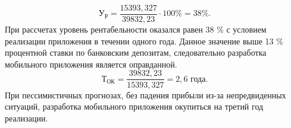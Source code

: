 \begin{equation}
 \label{eq:econ:add_payment}
 \text{У}_\text{Р} = \frac{15393,327}{39832,23} \cdot 100\% = 38\%.
\end{equation}
\linebreak
\linebreak
При рассчетах уровень рентабельности оказался равен 38 \% с условием реализации приложения в течении одного года. Данное значение выше 13 \% процентной ставки по банковским депозитам, следовательно разработка мобильного приложения является оправданной.
\linebreak
\linebreak
\begin{equation}
 \label{eq:econ:add_payment}
 \text{Т}_\text{ОК} = \frac{39832,23}{15393,327} = 2,6  \text{ года.}
\end{equation}
\linebreak
\linebreak
При пессимистичных прогнозах, без падения прибыли из-за непредвиденных ситуаций, разработка мобильного приложения окупиться на третий год реализации.
 
